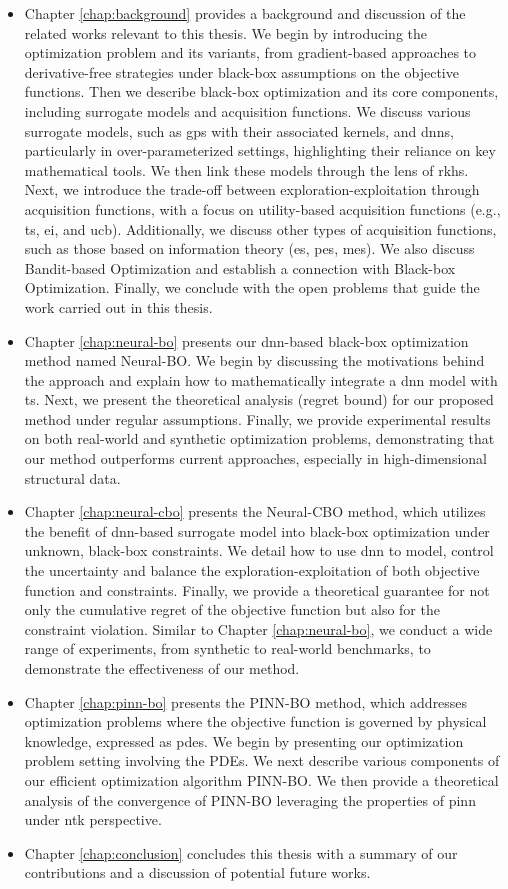 \begin{itemize}
    \item Chapter \ref{chap:background} provides a background and discussion of the related works relevant to this thesis. We begin by introducing the optimization problem and its variants,  from gradient-based approaches to derivative-free strategies under black-box assumptions on the objective functions. Then we describe black-box optimization and its core components, including surrogate models and acquisition functions. We discuss various surrogate models, such as \acp{gp} with their associated kernels, and \acp{dnn}, particularly in over-parameterized settings, highlighting their reliance on key mathematical tools. We then link these models through the lens of \ac{rkhs}. Next, we introduce the trade-off between exploration-exploitation through acquisition functions, with a focus on utility-based acquisition functions (e.g., \ac{ts}, \ac{ei}, and \ac{ucb}). Additionally, we discuss other types of acquisition functions, such as those based on information theory (\ac{es}, \ac{pes}, \ac{mes}). We also discuss Bandit-based Optimization and establish a connection with Black-box Optimization. Finally, we conclude with the open problems that guide the work carried out in this thesis.  
    \item Chapter \ref{chap:neural-bo} presents our \ac{dnn}-based black-box optimization method named Neural-BO. We begin by discussing the motivations behind the approach and explain how to mathematically integrate a \ac{dnn} model with \acl{ts}. Next, we present the theoretical analysis (regret bound) for our proposed method under regular assumptions.  Finally, we provide experimental results on both real-world and synthetic optimization problems, demonstrating that our method outperforms current approaches, especially in high-dimensional structural data.  
    \item Chapter \ref{chap:neural-cbo} presents the Neural-CBO method, which utilizes the benefit of \ac{dnn}-based surrogate model into black-box optimization under unknown, black-box constraints. We detail how to use \ac{dnn} to model, control the uncertainty and balance the exploration-exploitation of both objective function and constraints. Finally, we provide a theoretical guarantee for not only  the cumulative regret of the objective function but also for the constraint violation. Similar to Chapter \ref{chap:neural-bo}, we conduct a wide range of experiments, from synthetic to real-world benchmarks, to demonstrate the effectiveness of our method.     
    \item Chapter \ref{chap:pinn-bo} presents the PINN-BO method, which addresses optimization problems where the objective function is governed by physical knowledge, expressed as \acp{pde}. We begin by presenting our optimization problem setting involving the PDEs. We next describe various components of our efficient optimization algorithm PINN-BO. We then provide a theoretical analysis of the convergence of PINN-BO leveraging the properties of \ac{pinn} under \ac{ntk} perspective.
    \item Chapter \ref{chap:conclusion} concludes this thesis with a summary of our contributions and a discussion of potential future works.
\end{itemize}
